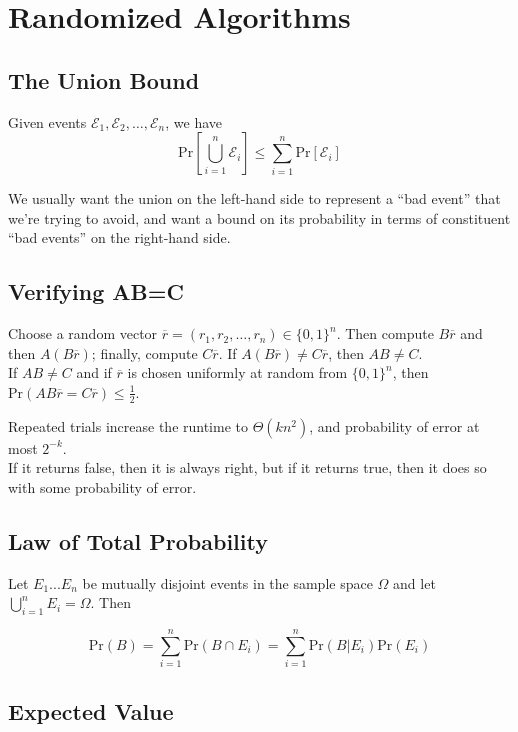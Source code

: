 \section{Randomized Algorithms}

\subsection{The Union Bound}
Given events $\mathscr{E}_1, \mathscr{E}_2, \ldots, \mathscr{E}_n$, we have
\[
	\text{Pr} \left[ \bigcup_{i=1}^{n} \mathscr{E}_i \right] \leq \sum_{i=1}^n \text{Pr}\left[ \mathscr{E}_i \right]
\]

We usually want the union on the left-hand side to represent a 	``bad event'' that we're trying to avoid, and want a bound on its probability in terms of constituent ``bad events'' on the right-hand side.


\subsection{Verifying AB=C}

Choose a random vector $\overline{r} = (r_1, r_2, \ldots, r_n) \in \{0, 1\}^n$. Then compute $B\overline{r}$ and then $A(B\overline{r})$; finally, compute $C\overline{r}$. If $A(B\overline{r}) \neq C\overline{r}$, then $AB \neq C$.\\

If $AB \neq C$ and if $\overline{r}$ is chosen uniformly at random from $\{0, 1\}^n$, then $\text{Pr}(AB\overline{r} = C\overline{r}) \leq \frac{1}{2}$.

Repeated trials increase the runtime to $\Theta(kn^2)$, and probability of error at most $2^{-k}$.\\

If it returns false, then it is always right, but if it returns true, then it does so with some probability of error.

\subsection{Law of Total Probability}
Let $E_1 ... E_n$ be mutually disjoint events in the sample space $\Omega$ and let $\bigcup_{i=1}^{n} E_{i} = \Omega$. Then

\[
	\text{Pr}(B) = \sum_{i=1}^n \text{Pr}(B \cap E_i) = \sum_{i=1}^n \text{Pr}(B | E_i) \text{Pr}(E_i)
\]


\subsection{Expected Value}

